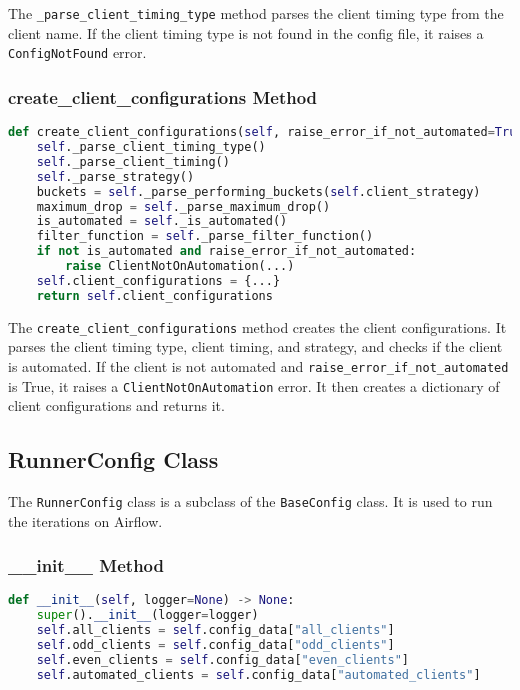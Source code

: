 The \verb|_parse_client_timing_type| method parses the client timing type from the client name. If the client timing type is not found in the config file, it raises a \verb|ConfigNotFound| error.

\subsubsection{create\_client\_configurations Method}

\begin{lstlisting}[language=Python]
def create_client_configurations(self, raise_error_if_not_automated=True):
    self._parse_client_timing_type()
    self._parse_client_timing()
    self._parse_strategy()
    buckets = self._parse_performing_buckets(self.client_strategy)
    maximum_drop = self._parse_maximum_drop()
    is_automated = self._is_automated()
    filter_function = self._parse_filter_function()
    if not is_automated and raise_error_if_not_automated:
        raise ClientNotOnAutomation(...)
    self.client_configurations = {...}
    return self.client_configurations
\end{lstlisting}

The \verb|create_client_configurations| method creates the client configurations. It parses the client timing type, client timing, and strategy, and checks if the client is automated. If the client is not automated and \verb|raise_error_if_not_automated| is True, it raises a \verb|ClientNotOnAutomation| error. It then creates a dictionary of client configurations and returns it.

\subsection{RunnerConfig Class}

The \verb|RunnerConfig| class is a subclass of the \verb|BaseConfig| class. It is used to run the iterations on Airflow.

\subsubsection{\_\_init\_\_ Method}

\begin{lstlisting}[language=Python]
def __init__(self, logger=None) -> None:
    super().__init__(logger=logger)
    self.all_clients = self.config_data["all_clients"]
    self.odd_clients = self.config_data["odd_clients"]
    self.even_clients = self.config_data["even_clients"]
    self.automated_clients = self.config_data["automated_clients"]
\end{lstlisting}

